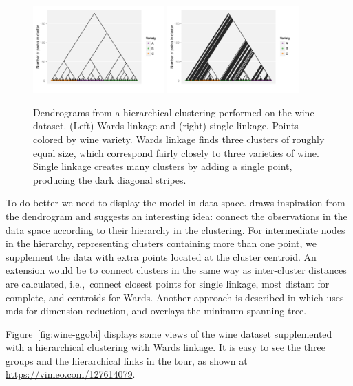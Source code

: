 \documentclass[preprint]{imsart}
\begin{document}
\begin{figure}[htbp]
  \centering
    \includegraphics[width=0.45\textwidth]{wine-ward}
    \includegraphics[width=0.45\textwidth]{wine-single}
  \caption{Dendrograms from a hierarchical clustering performed on the wine dataset.  (Left) Wards linkage and (right) single linkage.  Points colored by wine variety.  Wards linkage finds three clusters of roughly equal size, which correspond fairly closely to three varieties of wine.  Single linkage creates many clusters by adding a single point, producing the dark diagonal stripes. }
  \label{fig:wine-dendro}
\end{figure}

To do better we need to display the model in data space.  \citet{buja:1996} draws inspiration from the dendrogram and suggests an interesting idea: connect the observations in the data space according to their hierarchy in the clustering.  For intermediate nodes in the hierarchy, representing clusters containing more than one point, we supplement the data with extra points located at the cluster centroid.   An extension would be to connect clusters in the same way as inter-cluster distances are calculated, i.e.,\ connect closest points for single linkage, most distant for complete, and centroids for Wards.  Another approach is described in \citet{kim:2000} which uses {\sc mds} for dimension reduction, and overlays the minimum spanning tree.

Figure~\ref{fig:wine-ggobi} displays some views of the wine dataset supplemented with a hierarchical clustering with Wards linkage.  It is easy to see the three groups and the hierarchical links in the tour, as shown at \url{https://vimeo.com/127614079}.
\end{document}
